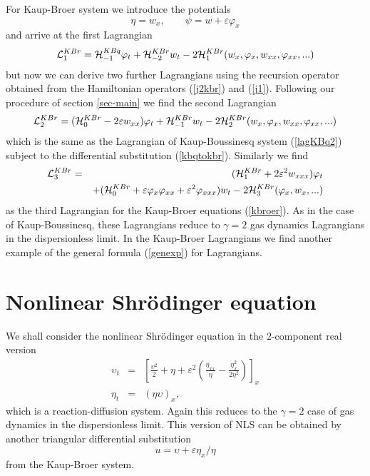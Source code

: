 \documentclass[a4paper,12pt]{article}
\begin{document}
For Kaup-Broer system we introduce the potentials
\begin{equation}
\eta = w_{x}, \qquad \psi = w + \varepsilon \varphi_{x}
\label{potKBr}
\end{equation}
and arrive at the first Lagrangian
\begin{equation}
{\cal L}_{1}^{KBr} =  {\cal H}_{-1}^{KBq} \varphi_{t} +  {\cal
H}_{-2}^{KBr} w_{t}  - 2 {\cal H}_{1}^{KBr}(w_{x},\varphi
_{x},w_{xx},\varphi _{xx},...) \label{lagKBr1}
\end{equation}
but now we can derive two further Lagrangians using the recursion
operator obtained from the Hamiltonian operators (\ref{j2kbr}) and
(\ref{j1}). Following our procedure of section \ref{sec-main} we
find the second Lagrangian
\begin{equation}
{\cal L}_{2}^{KBr} = ( {\cal H}_{0}^{KBr} -2\varepsilon
w_{xx})\varphi_{t} + {\cal H}_{-1}^{KBr} w_{t}  -2 {\cal
H}_{2}^{KBr}(w_{x},\varphi _{x},w_{xx},\varphi _{xx},...)
\label{lagKBr2}
\end{equation}
which is the same as the Lagrangian of Kaup-Boussinesq system
(\ref{lagKBq2}) subject to the differential substitution
(\ref{kbqtokbr}). Similarly we find
\begin{eqnarray}
{\cal L}_{3}^{KBr} & = & ({\cal H}_{1}^{KBr}  +2\varepsilon
^{2}w_{xxx}) \varphi _{t} \label{bk} \\ && + ( {\cal
H}_{0}^{KBr}+\varepsilon \varphi_{x}\varphi_{xx} +\varepsilon ^{2}
\varphi_{xxx})w_{t} -2 {\cal H}_{3}^{KBr}(\varphi _{x},w_{x},...)
\nonumber
\end{eqnarray}
as the third Lagrangian for the Kaup-Broer equations
(\ref{kbroer}). As in the case of Kaup-Boussinesq, these
Lagrangians reduce to $\gamma=2$ gas dynamics Lagrangians in the
dispersionless limit. In the Kaup-Broer Lagrangians we find
another example of the general formula (\ref{genexp}) for
Lagrangians.

\section{Nonlinear Shr\"odinger equation}

We shall consider the nonlinear Shr\"odinger equation in the
$2$-component real version
\begin{eqnarray}
\upsilon _{t} & = & \left[\frac{\upsilon ^{2}}{2} +\eta
+\varepsilon ^{2}(\frac{\eta _{xx}}{\eta }
-\frac{\eta_{x}^{2}}{2\eta ^{2}}) \right]_x \nonumber \\ \eta_{t}
& = & (\eta \upsilon )_{x}, \label{r2nls}
\end{eqnarray}
which is a reaction-diffusion system. Again this reduces to the
$\gamma=2$ case of gas dynamics in the dispersionless limit. This
version of NLS can be obtained by another triangular differential
substitution
\begin{equation}
u = \upsilon +\varepsilon \eta _{x}/\eta \label{kbrtonls}
\end{equation}
from the Kaup-Broer system.
\end{document}
